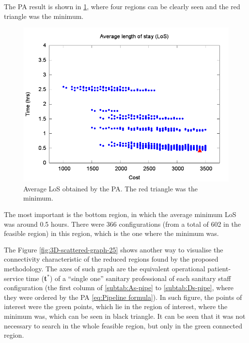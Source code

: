 \documentclass[11pt]{article} %
\begin{document}
The PA result is shown in \ref{subfig:pipe4-1}, where four regions
can be clearly seen and the red triangle was the minimum. 
\begin{figure}[H]
\noindent \begin{centering}
\includegraphics[width=0.95\columnwidth,height=0.23\paperheight]{figs4/v0/6400-602-25-pipe-LoS-min}
\par\end{centering}

\caption{Average LoS obtained by the PA. The red triangle was the minimum.
\label{subfig:pipe4-1}}
\end{figure}
The most important is the bottom region, in which the average minimum
LoS was around 0.5 hours. There were 366 configurations (from a total
of 602 in the feasible region) in this region, which is the one where
the minimum was.

The Figure \ref{fig:3D-scattered-graph-25} shows another way to visualise
the connectivity characteristic of the reduced regions found by the
proposed methodology. The axes of such graph are the equivalent operational
patient-service time ({\bf t$^*$}) of a ``single
one'' sanitary professional of each sanitary staff configuration
(the first column of \ref{subtab:As-pipe} to \ref{subtab:Ds-pipe},
where they were ordered by the PA \ref{eq:Pipeline formula}). In
such figure, the points of interest were the green points, which lie
in the region of interest, where the minimum was, which can be seen
in black triangle. It can be seen that it was not necessary to search
in the whole feasible region, but only in the green connected region. 
\end{document}
